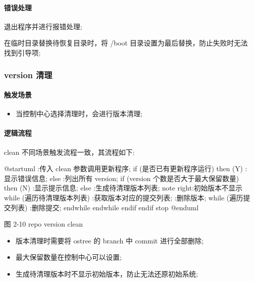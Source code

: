 \documentclass{utart}
\begin{document}
\paragraph{错误处理}
\begin{description}[leftmargin=!]
  \item[根路径未获取到:] 退出程序并进行报错处理;
  \item[在 initramfs 回滚时异常:] 在临时目录替换待恢复目录时，将 /boot 目录设置为最后替换，防止失败时无法找到引导项;
\end{description}

\subsubsection{version 清理}
\paragraph{触发场景}
\begin{itemize}[leftmargin=4em]
  \item 当控制中心选择清理时，会进行版本清理;
\end{itemize}

\paragraph{逻辑流程}
clean 不同场景触发流程一致，其流程如下: 
\begin{center}
  \begin{adjustbox}{scale=0.65}
    \begin{plantuml}
      @startuml
      :传入 clean 参数调用更新程序;
      if (是否已有更新程序运行) then (Y)
      :显示错误信息;
      else
      :列出所有 version;
      if (version 个数是否大于最大保留数量) then (N)
      :显示提示信息;
      else
      :生成待清理版本列表;
      note right:初始版本不显示
      while (遍历待清理版本列表)
      :获取版本对应的提交列表;
      :删除版本;
      while (遍历提交列表)
      :删除提交;
      endwhile
      endwhile
      endif
      endif
      stop
      @enduml
    \end{plantuml}
  \end{adjustbox}

  图 2-10 repo version clean
\end{center}
\begin{itemize}[leftmargin=4em]
  \item 版本清理时需要将 ostree 的 branch 中 commit 进行全部删除;
  \item 最大保留数量在控制中心可以设置;
  \item 生成待清理版本时不显示初始版本，防止无法还原初始系统;
\end{itemize}
\end{document}
